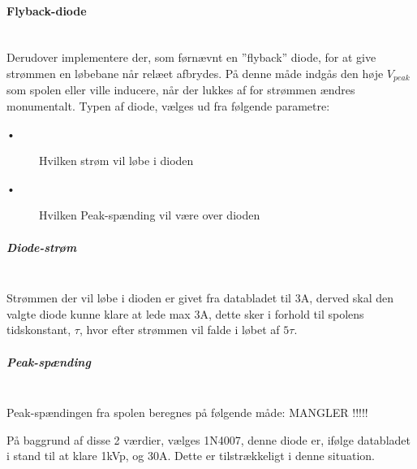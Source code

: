 \paragraph{Flyback-diode} \hspace{0pt} \\
Derudover implementere der, som førnævnt en ”flyback” diode, for at give strømmen en løbebane når relæet afbrydes. På denne måde indgås den høje $V_{peak}$ som spolen eller ville inducere, når der lukkes af for strømmen ændres monumentalt. Typen af diode, vælges ud fra følgende parametre:


\begin{description}
 \item[•] Hvilken strøm vil løbe i dioden
 \item[•] Hvilken Peak-spænding vil være over dioden
\end{description}

\subparagraph{Diode-strøm} \hspace{0pt} \\
Strømmen der vil løbe i dioden er givet fra databladet til  3A, derved skal den valgte diode kunne klare at lede max 3A, dette sker i forhold til spolens tidskonstant, $\tau$, hvor efter strømmen vil falde i løbet af $ 5 \tau$.

\subparagraph{Peak-spænding} \hspace{0pt} \\
Peak-spændingen fra spolen beregnes på følgende måde: MANGLER !!!!!

På baggrund af disse 2 værdier, vælges 1N4007, denne diode er, ifølge databladet i stand til at klare 1kVp, og 30A. Dette er tilstrækkeligt i denne situation.